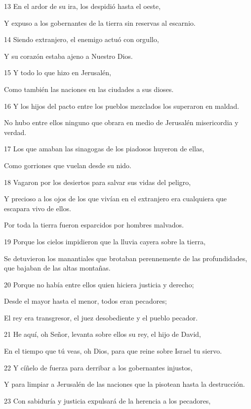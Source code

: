 \par 13 En el ardor de su ira, los despidió hasta el oeste,
\par     Y expuso a los gobernantes de la tierra sin reservas al escarnio.
\par 14 Siendo extranjero, el enemigo actuó con orgullo,
\par     Y su corazón estaba ajeno a Nuestro Dios.
\par 15 Y todo lo que hizo en Jerusalén,
\par     Como también las naciones en las ciudades a sus dioses.
\par   
\par 16 Y los hijos del pacto entre los pueblos mezclados los superaron en maldad.
\par     No hubo entre ellos ninguno que obrara en medio de Jerusalén misericordia y verdad.
\par 17 Los que amaban las sinagogas de los piadosos huyeron de ellas,
\par     Como gorriones que vuelan desde su nido.
\par 18 Vagaron por los desiertos para salvar sus vidas del peligro,
\par     Y precioso a los ojos de los que vivían en el extranjero era cualquiera que escapara vivo de ellos.
\par     Por toda la tierra fueron esparcidos por hombres malvados.
\par 19 Porque los cielos impidieron que la lluvia cayera sobre la tierra,
\par     Se detuvieron los manantiales que brotaban perennemente de las profundidades, que bajaban de las altas montañas.
\par 20 Porque no había entre ellos quien hiciera justicia y derecho;
\par     Desde el mayor hasta el menor, todos eran pecadores;
\par     El rey era transgresor, el juez desobediente y el pueblo pecador.
\par 21 He aquí, oh Señor, levanta sobre ellos su rey, el hijo de David,
\par     En el tiempo que tú veas, oh Dios, para que reine sobre Israel tu siervo.
\par 22 Y cíñelo de fuerza para derribar a los gobernantes injustos,
\par     Y para limpiar a Jerusalén de las naciones que la pisotean hasta la destrucción.
\par 23 Con sabiduría y justicia expulsará de la herencia a los pecadores,
